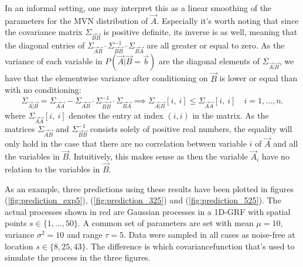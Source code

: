 In an informal setting, one may interpret this as a linear smoothing of the parameters for the MVN distribution of $\vec{A}$. Especially it's worth noting that since the covariance matrix $\Sigma_{\vec{B}\vec{B}}$ is positive definite, its inverse is as well, meaning that the diagonal entries of $\Sigma_{\vec{A}\vec{B}} \cdot \Sigma_{\vec{B}\vec{B}}^{-1} \cdot \Sigma_{\vec{B}\vec{A}}$ are all greater or equal to zero. As the variance of each variable in $P(\vec{A} | \vec{B} = \vec{b})$ are the diagonal elements of $\Sigma_{\vec{A}|\vec{B}}$, we have that the elementwise variance after conditioning on $\vec{B}$ is lower or equal than with no conditioning: 
\begin{equation}
\Sigma_{\vec{A}|\vec{B}} = \Sigma_{\vec{A}\vec{A}} - \Sigma_{\vec{A}\vec{B}} \cdot \Sigma_{\vec{B}\vec{B}}^{-1} \cdot \Sigma_{\vec{B}\vec{A}}
\implies \Sigma_{\vec{A}|\vec{B}}[i, \ i]  \leq \Sigma_{\vec{A}\vec{A}}[i, \ i] \quad  i = 1, \dotsc, n.
\end{equation}
where $\Sigma_{\vec{A}\vec{A}}[i, \ i]$ denotes the entry at index $(i, i)$ in the matrix. As the matrices $\Sigma_{\vec{A}\vec{B}}$ and $\Sigma_{\vec{B}\vec{B}}^{-1}$ consists solely of positive real numbers, the equality will only hold in the case that there are no correlation between variable $i$ of $\vec{A}$ and all the variables in $\vec{B}$. Intuitively, this makes sense as then the variable $\vec{A}_i$ have no relation to the variables in $\vec{B}$. 

As an example, three predictions using these results have been plotted in figures (\ref{fig:prediction_exp5}), (\ref{fig:prediction_325}) and (\ref{fig:prediction_525}). The actual processes shown in red are Gaussian processes in a 1D-GRF with spatial points $s \in \{1,\dots, 50\}$. A common set of parameters are set with mean $\mu = 10$, variance $\sigma^2 = 10$ and range $\tau = 5$. Data were sampled in all cases as noise-free at location $s \in \{8, 25, 43\}$. The difference is which covariancefunction that's used to simulate the process in the three figures.

